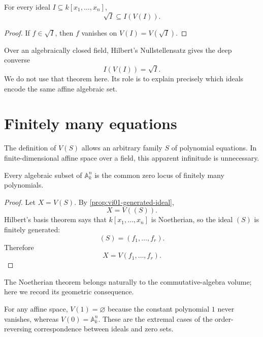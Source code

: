 \begin{corollary}
\label{cor:vi01-radical-contained}
For every ideal \(I\subseteq k[x_1,\dots,x_n]\),
\[
  \sqrt I\subseteq I(V(I)).
\]
\end{corollary}

\begin{proof}
If \(f\in\sqrt I\), then \(f\) vanishes on \(V(I)=V(\sqrt I)\).
\end{proof}

Over an algebraically closed field, Hilbert's Nullstellensatz gives the deep converse
\[
  I(V(I))=\sqrt I.
\]
We do not use that theorem here.  Its role is to explain precisely which ideals encode the
same affine algebraic set.

\section{Finitely many equations}
\label{sec:vi01-finite-equations}

The definition of \(V(S)\) allows an arbitrary family \(S\) of polynomial equations.  In
finite-dimensional affine space over a field, this apparent infinitude is unnecessary.

\begin{proposition}
\label{prop:vi01-finite-description}
Every algebraic subset of \(\mathbb A_k^n\) is the common zero locus of finitely many
polynomials.
\end{proposition}

\begin{proof}
Let \(X=V(S)\).  By \cref{prop:vi01-generated-ideal},
\[
  X=V((S)).
\]
Hilbert's basis theorem says that \(k[x_1,\dots,x_n]\) is Noetherian, so the ideal \((S)\)
is finitely generated:
\[
  (S)=(f_1,\dots,f_r).
\]
Therefore
\[
  X=V(f_1,\dots,f_r).
\]
\end{proof}

The Noetherian theorem belongs naturally to the commutative-algebra volume; here we record
its geometric consequence.

\begin{example}\label{ex:vi01-expand-03}
For any affine space, $V(1)=\varnothing$ because the constant polynomial $1$ never vanishes, whereas $V(0)=\mathbb A^n_k$.  These are the extremal cases of the order-reversing correspondence between ideals and zero sets.
\end{example}
